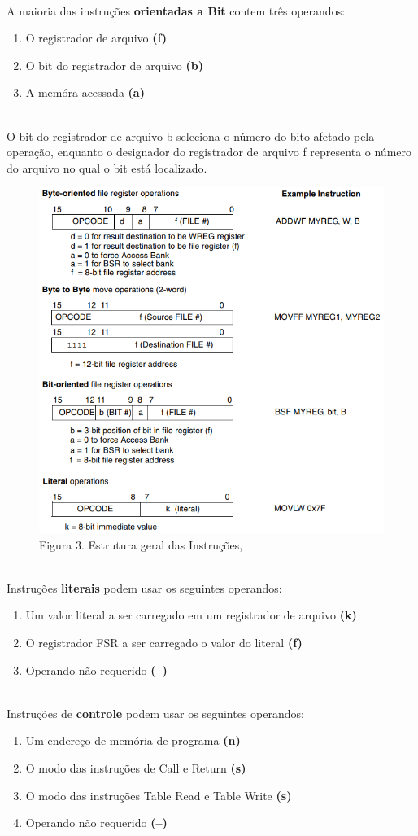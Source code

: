 \documentclass[12pt]{article}
\begin{document}
\\A maioria das instruções \textbf{orientadas a Bit} contem três operandos:
\begin{enumerate}
	\item O registrador de arquivo \textbf{(f)}
	\item O bit do registrador de arquivo \textbf{(b)}
	\item A memóra acessada \textbf{(a)}
\end{enumerate}
\\O bit do registrador de arquivo b seleciona o número do bito afetado pela operação, enquanto o designador do registrador de arquivo f representa o número do arquivo no qual o bit está localizado.
\begin{figure}[h]
	\centering
	\includegraphics[width=.5\textwidth]{figs/instructions.png}
	\caption{Figura 3. Estrutura geral das Instruções, }
\end{figure}
\clearpage
\\Instruções \textbf{literais} podem usar os seguintes operandos:
\begin{enumerate}
	\item Um valor literal a ser carregado em um registrador de arquivo \textbf{(k)}
	\item O registrador FSR a ser carregado o valor do literal \textbf{(f)}
	\item Operando não requerido \textbf{(--)}
\end{enumerate}
\\Instruções de \textbf{controle} podem usar os seguintes operandos:
\begin{enumerate}
	\item Um endereço de memória de programa \textbf{(n)}
	\item O modo das instruções de Call e Return \textbf{(s)}
	\item O modo das instruções Table Read e Table Write \textbf{(s)}
	\item Operando não requerido \textbf{(--)}
\end{enumerate}
\end{document}
